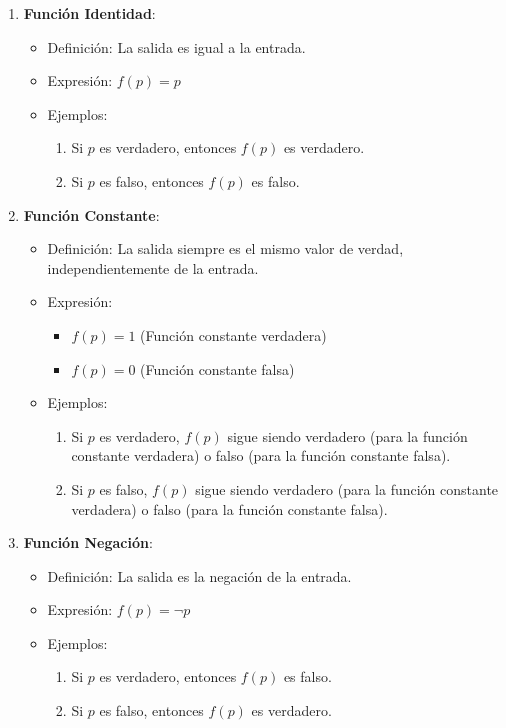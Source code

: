 \begin{enumerate}
	\item \textbf{Función Identidad}:
	\begin{itemize}
		\item Definición: La salida es igual a la entrada.
		\item Expresión: $f(p) = p$
		\item Ejemplos:
		\begin{enumerate}
			\item Si $p$ es verdadero, entonces $f(p)$ es verdadero.
			\item Si $p$ es falso, entonces $f(p)$ es falso.
		\end{enumerate}
	\end{itemize}
	
	\item \textbf{Función Constante}:
	\begin{itemize}
		\item Definición: La salida siempre es el mismo valor de verdad, independientemente de la entrada.
		\item Expresión:
		\begin{itemize}
			\item $f(p) = 1$ (Función constante verdadera)
			\item $f(p) = 0$ (Función constante falsa)
		\end{itemize}
		\item Ejemplos:
		\begin{enumerate}
			\item Si $p$ es verdadero, $f(p)$ sigue siendo verdadero (para la función constante verdadera) o falso (para la función constante falsa).
			\item Si $p$ es falso, $f(p)$ sigue siendo verdadero (para la función constante verdadera) o falso (para la función constante falsa).
		\end{enumerate}
	\end{itemize}
	
	\item \textbf{Función Negación}:
	\begin{itemize}
		\item Definición: La salida es la negación de la entrada.
		\item Expresión: \( f(p) = \neg p \)
		\item Ejemplos:
		\begin{enumerate}
			\item Si $p$ es verdadero, entonces $f(p)$ es falso.
			\item Si $p$ es falso, entonces $f(p)$ es verdadero.
		\end{enumerate}
	\end{itemize}
	

\end{enumerate}
